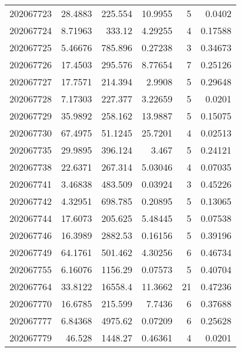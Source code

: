 \begin{tabular}{rrrrrr}
 202067723 &         28.4883  &      225.554  &           10.9955  &           5 & 0.0402  \\
 202067724 &          8.71963 &      333.12   &            4.29255 &           4 & 0.17588 \\
 202067725 &          5.46676 &      785.896  &            0.27238 &           3 & 0.34673 \\
 202067726 &         17.4503  &      295.576  &            8.77654 &           7 & 0.25126 \\
 202067727 &         17.7571  &      214.394  &            2.9908  &           5 & 0.29648 \\
 202067728 &          7.17303 &      227.377  &            3.22659 &           5 & 0.0201  \\
 202067729 &         35.9892  &      258.162  &           13.9887  &           5 & 0.15075 \\
 202067730 &         67.4975  &       51.1245 &           25.7201  &           4 & 0.02513 \\
 202067735 &         29.9895  &      396.124  &            3.467   &           5 & 0.24121 \\
 202067738 &         22.6371  &      267.314  &            5.03046 &           4 & 0.07035 \\
 202067741 &          3.46838 &      483.509  &            0.03924 &           3 & 0.45226 \\
 202067742 &          4.32951 &      698.785  &            0.20895 &           5 & 0.13065 \\
 202067744 &         17.6073  &      205.625  &            5.48445 &           5 & 0.07538 \\
 202067746 &         16.3989  &     2882.53   &            0.16156 &           5 & 0.39196 \\
 202067749 &         64.1761  &      501.462  &            4.30256 &           6 & 0.46734 \\
 202067755 &          6.16076 &     1156.29   &            0.07573 &           5 & 0.40704 \\
 202067764 &         33.8122  &    16558.4    &           11.3662  &          21 & 0.47236 \\
 202067770 &         16.6785  &      215.599  &            7.7436  &           6 & 0.37688 \\
 202067777 &          6.84368 &     4975.62   &            0.07209 &           6 & 0.25628 \\
 202067779 &         46.528   &     1448.27   &            0.46361 &           4 & 0.0201  \\

\end{tabular}
